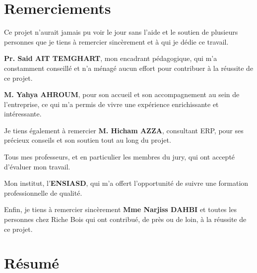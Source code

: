 \documentclass[12pt,a4paper]{report}
\newcommand{\preliminarymark}[1]{\markboth{\MakeUppercase{#1}}{}}
\begin{document}
\chapter*{Remerciements}
\preliminarymark{}
\thispagestyle{plain}

\vspace*{2cm}

Ce projet n'aurait jamais pu voir le jour sans l'aide et le soutien de plusieurs personnes que je tiens à remercier sincèrement et à qui je dédie ce travail.

\vspace{0.8cm}

\textbf{Pr. Said AIT TEMGHART}, mon encadrant pédagogique, qui m'a constamment conseillé et n'a ménagé aucun effort pour contribuer à la réussite de ce projet.

\vspace{0.5cm}

\textbf{M. Yahya AHROUM}, pour son accueil et son accompagnement au sein de l'entreprise, ce qui m'a permis de vivre une expérience enrichissante et intéressante.

\vspace{0.5cm}

Je tiens également à remercier \textbf{M. Hicham AZZA}, consultant ERP, pour ses précieux conseils et son soutien tout au long du projet.

\vspace{0.5cm}

Tous mes professeurs, et en particulier les membres du jury, qui ont accepté d'évaluer mon travail.

\vspace{0.5cm}

Mon institut, l'\textbf{ENSIASD}, qui m'a offert l'opportunité de suivre une formation professionnelle de qualité.

\vspace{0.5cm}

Enfin, je tiens à remercier sincèrement \textbf{Mme Narjiss DAHBI} et toutes les personnes chez Riche Bois qui ont contribué, de près ou de loin, à la réussite de ce projet.

\newpage

\chapter*{Résumé}
\preliminarymark{}
\thispagestyle{plain}
\end{document}
